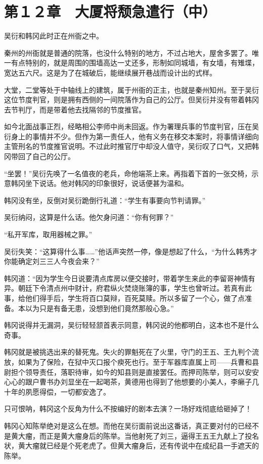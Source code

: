 \section{第１２章　大厦将颓急遣行（中）}

吴衍和韩冈此时正在州衙之中。

秦州的州衙就是普通的院落，也没什么特别的地方，不过占地大，屋舍多罢了。唯一有点特别的，就是周围的围墙高达一丈还多，形制如同城墙，有女墙，有雉堞，宽达五六尺。这是为了在城破后，能继续展开巷战而设计出的式样。

大堂，二堂等处于中轴线上的建筑，属于州衙的正主，也就是秦州知州。至于吴衍这位节度判官，则是拥有西侧的一间院落作为自己的公厅。但吴衍并没有带着韩冈去节判厅，而是带着他去找隔邻的节度推官。

如今北面战事正烈，经略相公李师中尚未回返。作为署理兵事的节度判官，压在吴衍身上的事情并不少。但作为第一责任人，他有义务在移交本案时，将事情详细向主管刑名的节度推官说明。不过此时推官厅中却没人值守，吴衍叹了口气，又把韩冈带回了自己的公厅。

“坐罢！”吴衍先唤了一名值夜的老兵，命他端茶上来。再指着下首的一张交椅，示意韩冈坐下说话。他对韩冈的印象很好，说话便甚为温和。

韩冈没有坐，反倒对吴衍跪倒行礼道：“学生有事要向节判请罪。”

吴衍纳闷，这算是什么话。他欠身问道：“你有何罪？”

“私开军库，取用器械之罪。”

吴衍失笑：“这算得什么事……”他话声突然一停，像是想起了什么，“为什么韩秀才你能确定刘三三人今夜会来？”

韩冈道：“因为学生今日说要清点库房以便交接时，带着学生来此的李留哥神情有异。朝廷下令清点州中财计，府君纵火焚烧账簿的事，学生也曾听过。若真有此事，给他们得手后，学生将百口莫辩，百死莫赎。所以多留了一个心，做了点准备。本以为只是有备无患，没想到他们竟然那般心急。”

韩冈说得并无漏洞，吴衍轻轻颔首表示同意，韩冈说的他都明白，这本也不是什么奇事。

韩冈就是被挑选出来的替死鬼。失火的罪魁死在了火里，守门的王五、王九判个流放，如果为了保险，在狱中灭口报个瘐死也行。至于军器库直属上司——兵曹和县尉担个领导责任，落职待审，如今的知县则是直接罢任。而押司陈举，则可以安安心心的跟户曹书办刘显坐在一起喝茶，黄德用也得到了他想要的小美人，李癞子几十年的夙愿得偿，一切都安逸了。

只可恨呐，韩冈这个反角为什么不按编好的剧本去演？一场好戏彻底给砸掉了！

韩冈心知陈举绝对是这么在想。而他在吴衍面前说出这番话，真正要对付的已经不是黄大瘤，而正是黄大瘤身后的陈举。当他射死了刘三，逼得王五王九献上了投名状，黄大瘤就已经是个死老虎了。但黄大瘤身后，还有传说中在成纪县一手遮天的陈举。

